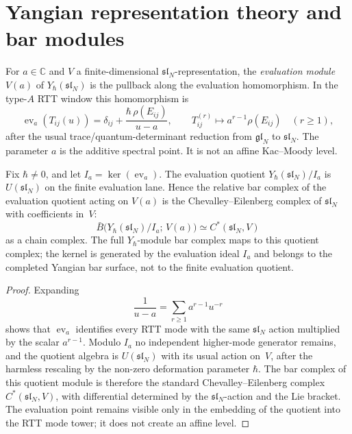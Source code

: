 \section{Yangian representation theory and bar modules}
\label{sec:yangian-rep-bar}

\begin{definition}\label{def:evaluation-module-yangian}
For $a \in \mathbb{C}$ and $V$ a finite-dimensional
$\mathfrak{sl}_N$-representation, the \emph{evaluation module}
$V(a)$ of $Y_\hbar(\mathfrak{sl}_N)$ is the pullback along the
evaluation homomorphism. In the type-$A$ RTT window this homomorphism is
\[
\operatorname{ev}_a(T_{ij}(u))
 =
\delta_{ij}+\frac{\hbar\,\rho(E_{ij})}{u-a},
\qquad
T_{ij}^{(r)}\longmapsto a^{r-1}\rho(E_{ij})
\quad (r\ge1),
\]
after the usual trace/quantum-determinant reduction from
$\mathfrak{gl}_N$ to $\mathfrak{sl}_N$. The parameter $a$ is the
additive spectral point. It is not an affine Kac--Moody level.
\end{definition}

\begin{proposition}
\label{prop:eval-module-bar}

Fix \(\hbar\ne0\), and let $I_a=\ker(\operatorname{ev}_a)$. The
evaluation quotient $Y_\hbar(\mathfrak{sl}_N)/I_a$ is
$U(\mathfrak{sl}_N)$ on the finite evaluation lane. Hence the
relative bar complex of the evaluation quotient acting on $V(a)$ is
the Chevalley--Eilenberg complex of $\mathfrak{sl}_N$ with
coefficients in~$V$:
\[
\bar{B}\bigl(Y_\hbar(\mathfrak{sl}_N)/I_a;\,V(a)\bigr)
\simeq C^*(\mathfrak{sl}_N, V)
\]
as a chain complex. The full $Y_\hbar$-module bar complex maps to this
quotient complex; the kernel is generated by the evaluation ideal
$I_a$ and belongs to the completed Yangian bar surface, not to the
finite evaluation quotient.
\end{proposition}

\begin{proof}
Expanding
\[
\frac{1}{u-a}=\sum_{r\ge1}a^{r-1}u^{-r}
\]
shows that $\operatorname{ev}_a$ identifies every RTT mode with the
same $\mathfrak{sl}_N$ action multiplied by the scalar $a^{r-1}$.
Modulo $I_a$ no independent higher-mode generator remains, and the
quotient algebra is $U(\mathfrak{sl}_N)$ with its usual action on~$V$,
after the harmless rescaling by the non-zero deformation parameter
\(\hbar\). The bar complex of this quotient module is therefore the
standard Chevalley--Eilenberg complex \(C^*(\mathfrak{sl}_N,V)\), with
differential determined by the $\mathfrak{sl}_N$-action and the Lie
bracket. The evaluation point remains visible only in the embedding of
the quotient into the RTT mode tower; it does not create an affine
level.
\end{proof}

